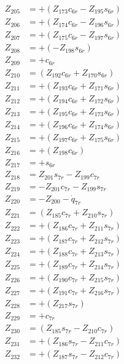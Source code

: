 \begin{multicols}{2}
\begin{align}
Z_{205} &= + (Z_{173}c_{6r} - Z_{195}s_{6r}) \nonumber \\
Z_{206} &= + (Z_{174}c_{6r} - Z_{196}s_{6r}) \nonumber \\
Z_{207} &= + (Z_{175}c_{6r} - Z_{197}s_{6r}) \nonumber \\
Z_{208} &= + (-Z_{198}s_{6r}) \nonumber \\ 
Z_{209} &= + c_{6r} \nonumber \\
Z_{210} &= (Z_{192}c_{6r} + Z_{170}s_{6r}) \nonumber \\
Z_{211} &= + (Z_{193}c_{6r} + Z_{171}s_{6r}) \nonumber \\
Z_{212} &= + (Z_{194}c_{6r} + Z_{172}s_{6r}) \nonumber \\
Z_{213} &= + (Z_{195}c_{6r} + Z_{173}s_{6r}) \nonumber \\
Z_{214} &= + (Z_{196}c_{6r} + Z_{174}s_{6r}) \nonumber \\
Z_{215} &= + (Z_{197}c_{6r} + Z_{175}s_{6r}) \nonumber \\
Z_{216} &= + (Z_{198}c_{6r}) \nonumber \\
Z_{217} &= + s_{6r} \nonumber \\
Z_{218} &= Z_{201}s_{7r} - Z_{199}c_{7r} \nonumber \\
Z_{219} &= - Z_{201}c_{7r} - Z_{199}s_{7r} \nonumber \\
Z_{220} &=                   - Z_{200} - \dot{q}_{7r} \nonumber \\
Z_{221} &= (Z_{185}c_{7r} + Z_{210}s_{7r}) \nonumber \\
Z_{222} &= + (Z_{186}c_{7r} + Z_{211}s_{7r}) \nonumber \\
Z_{223} &= + (Z_{187}c_{7r} + Z_{212}s_{7r}) \nonumber \\
Z_{224} &= + (Z_{188}c_{7r} + Z_{213}s_{7r}) \nonumber \\
Z_{225} &= + (Z_{189}c_{7r} + Z_{214}s_{7r}) \nonumber \\
Z_{226} &= + (Z_{190}c_{7r} + Z_{215}s_{7r}) \nonumber \\
Z_{227} &= + (Z_{191}c_{7r} + Z_{216}s_{7r}) \nonumber \\
Z_{228} &= + (Z_{217}s_{7r}) \nonumber \\
Z_{229} &= + c_{7r} \nonumber \\
Z_{230} &= (Z_{185}s_{7r} - Z_{210}c_{7r}) \nonumber \\
Z_{231} &= + (Z_{186}s_{7r} - Z_{211}c_{7r}) \nonumber \\
Z_{232} &= + (Z_{187}s_{7r} - Z_{212}c_{7r}) \nonumber \\

\end{align}
\end{multicols}
